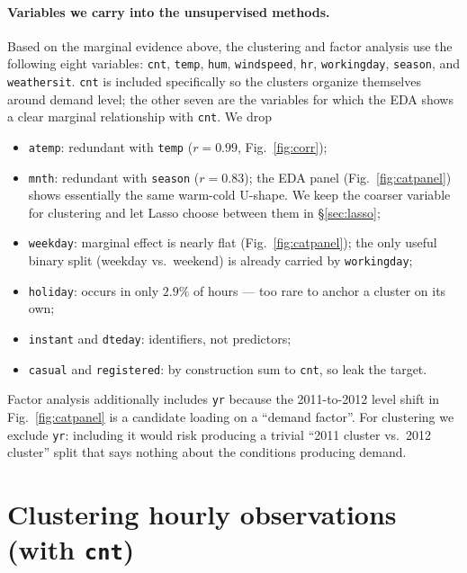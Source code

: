 \documentclass[11pt]{article}
\begin{document}
\paragraph{Variables we carry into the unsupervised methods.}
Based on the marginal evidence above, the clustering and factor
analysis use the following eight variables:
\texttt{cnt}, \texttt{temp}, \texttt{hum}, \texttt{windspeed},
\texttt{hr}, \texttt{workingday}, \texttt{season}, and
\texttt{weathersit}.
\texttt{cnt} is included specifically so the clusters organize
themselves around demand level; the other seven are the variables for which the EDA shows a clear marginal relationship with \texttt{cnt}. We drop
\begin{itemize}
\item \texttt{atemp}: redundant with \texttt{temp} ($r=0.99$,
      Fig.~\ref{fig:corr});
\item \texttt{mnth}: redundant with \texttt{season} ($r=0.83$); the
      EDA panel (Fig.~\ref{fig:catpanel}) shows essentially the
      same warm-cold U-shape. We keep the coarser variable for
      clustering and let Lasso choose between them in
      \S\ref{sec:lasso};
\item \texttt{weekday}: marginal effect is nearly flat
      (Fig.~\ref{fig:catpanel}); the only useful binary split
      (weekday vs.\ weekend) is already carried by
      \texttt{workingday};
\item \texttt{holiday}: occurs in only $2.9\%$ of hours --- too rare
      to anchor a cluster on its own;
\item \texttt{instant} and \texttt{dteday}: identifiers, not
      predictors;
\item \texttt{casual} and \texttt{registered}: by construction sum
      to \texttt{cnt}, so leak the target.
\end{itemize}
Factor analysis additionally includes \texttt{yr} because the
2011-to-2012 level shift in Fig.~\ref{fig:catpanel} is a candidate
loading on a ``demand factor''. For clustering we exclude
\texttt{yr}: including it would risk producing a trivial
``2011 cluster vs.\ 2012 cluster'' split that says nothing about
the conditions producing demand.

\section{Clustering hourly observations (with \texttt{cnt})}\label{sec:clustering}
\end{document}
